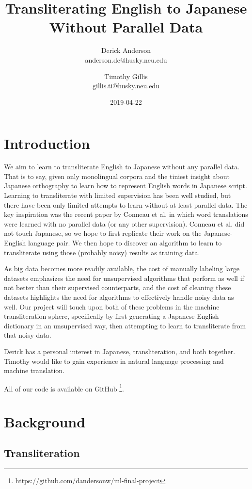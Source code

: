 \documentclass{article}
\title{Transliterating English to Japanese Without Parallel Data}
\date{2019-04-22}
\author{Derick Anderson \\ anderson.de@husky.neu.edu
  \and Timothy Gillis \\ gillis.ti@husky.neu.edu }
\begin{document}
\maketitle

\section*{Introduction}

We aim to learn to transliterate English to Japanese
without any parallel data.
That is to say,
given only monolingual corpora
and the tiniest insight about Japanese orthography
to learn how to represent English words in Japanese script.
Learning to transliterate with limited supervision has been well studied,
but there have been only limited attempts to learn without at least parallel data.
The key inspiration was the recent paper by
Conneau et al. \cite{Conneau2018WordTW}
in which word translations were learned with no parallel data
(or any other supervision).
Conneau et al. did not touch Japanese,
so we hope to first replicate their work on the Japanese-English language pair.
We then hope to discover an algorithm to learn to transliterate
using those (probably noisy) results as training data.

As big data becomes more readily available, the cost of manually labeling large
datasets emphasizes the need for unsupervised algorithms that perform as well if
not better than their supervised counterparts, and the cost of cleaning these
datasets highlights the need for algorithms to effectively handle noisy data as well.
Our project will touch upon both of these problems in the machine transliteration
sphere, specifically by first generating a Japanese-English dictionary in an
unsupervised way, then attempting to learn to transliterate from that noisy data.

Derick has a personal interest in Japanese, transliteration, and both together.
Timothy would like to gain experience in natural language processing and machine
translation.

All of our code is available on GitHub
\footnote{https://github.com/dandersonw/ml-final-project}.

\section*{Background}

\subsection*{Transliteration}
\end{document}
